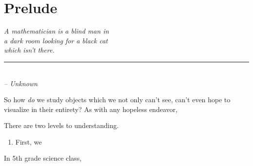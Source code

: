 \chapter*{Prelude}

\begin{flushleft}
	\textsl{A mathematician is a blind man in }\\
	\textsl{a dark room looking for a black cat}\\
	\textsl{which isn’t there.}\\
	\rule[0pt]{15em}{0.5pt}\\
	\textsl{-- Unknown}
\end{flushleft}

\vspace{2em}

So how \emph{do} we study objects which we not only can't see, can't even hope to visualize in their entirety? As with any hopeless endeavor, 

There are two levels to understanding.
\begin{enumerate}
	\item First, we
\end{enumerate}

In 5th grade science class,
